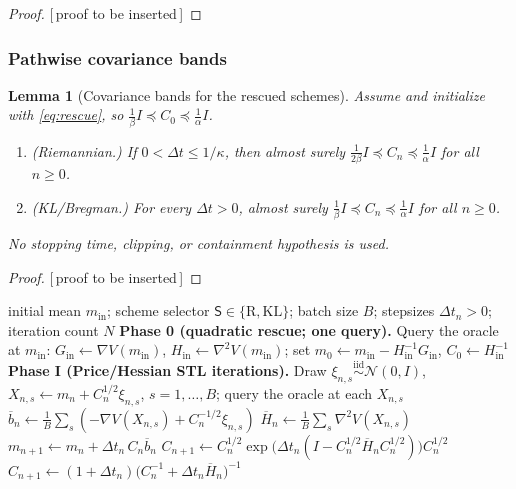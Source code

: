 \documentclass[11pt]{article}
\theoremstyle{plain}
\newtheorem{lemma}[lemma]{Lemma}
\theoremstyle{definition}
\theoremstyle{remark}
\newcommand{\N}{\mathcal{N}}
\newcommand{\KL}{\mathrm{KL}}
\newcommand{\Id}{I}
\newcommand{\Riem}{\mathrm{R}}
\newcommand{\PROOFHOLE}{{\color{red}\textsf{[\,proof to be inserted\,]}}}
\begin{document}
\begin{proof}
\PROOFHOLE
\end{proof}
\subsubsection{Pathwise covariance bands}
\label{subsec:bands}

\begin{lemma}[Covariance bands for the rescued schemes]
\label{lem:stoch-band}
Assume  and initialize with \eqref{eq:rescue}, so
$\tfrac1\beta\Id\preceq C_0\preceq\tfrac1\alpha\Id$.
\begin{enumerate}
\item \textup{(Riemannian.)} If $0<\Delta t\leq1/\kappa$, then almost surely
$\tfrac1{2\beta}\Id\preceq C_n\preceq\tfrac1\alpha\Id$ for all $n\geq0$.
\item \textup{(KL/Bregman.)} For every $\Delta t>0$, almost surely
$\tfrac1\beta\Id\preceq C_n\preceq\tfrac1\alpha\Id$ for all $n\geq0$.
\end{enumerate}
No stopping time, clipping, or containment hypothesis is used.
\end{lemma}

\begin{proof}
\PROOFHOLE
\end{proof}

\begin{algorithm}[t]
\caption{Quadratic-rescued minibatch Price/Hessian STL Fisher--Rao scheme}
\label{alg:unified}
\begin{algorithmic}[1]
\Require initial mean $m_{\mathrm{in}}$; scheme selector $\mathsf S\in\{\Riem,\KL\}$; batch size $B$;
stepsizes $\Delta t_n>0$; iteration count $N$
\State \textbf{Phase 0 (quadratic rescue; one query).} Query the oracle at $m_{\mathrm{in}}$:
$G_{\mathrm{in}}\gets\nabla V(m_{\mathrm{in}})$, $H_{\mathrm{in}}\gets\nabla^2V(m_{\mathrm{in}})$;
set $m_0\gets m_{\mathrm{in}}-H_{\mathrm{in}}^{-1}G_{\mathrm{in}}$, $C_0\gets H_{\mathrm{in}}^{-1}$
\State \textbf{Phase I (Price/Hessian STL iterations).}
    \State Draw $\xi_{n,s}\overset{\text{iid}}{\sim}\N(0,\Id)$, $X_{n,s}\gets m_n+C_n^{1/2}\xi_{n,s}$, $s=1,\dots,B$; query the oracle at each $X_{n,s}$
    \State $\overline b_n\gets\frac1B\sum_s(-\nabla V(X_{n,s})+C_n^{-1/2}\xi_{n,s})$ 
    \State $\overline H_n\gets\frac1B\sum_s\nabla^2V(X_{n,s})$ 
    \State $m_{n+1}\gets m_n+\Delta t_n\,C_n\overline b_n$
    \If{$\mathsf S=\Riem$}
        \State $C_{n+1}\gets C_n^{1/2}\exp\bigl(\Delta t_n(\Id-C_n^{1/2}\overline H_nC_n^{1/2})\bigr)C_n^{1/2}$
    \Else
        \State $C_{n+1}\gets(1+\Delta t_n)\bigl(C_n^{-1}+\Delta t_n\overline H_n\bigr)^{-1}$
    \EndIf
\EndFor
\end{algorithmic}
\end{algorithm}
\end{document}
